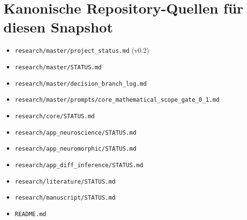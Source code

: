 \documentclass[11pt,a4paper]{article}
\begin{document}
\section*{Kanonische Repository-Quellen für diesen Snapshot}
\begin{itemize}
\item \texttt{research/master/project\_status.md} (v0.2)
\item \texttt{research/master/STATUS.md}
\item \texttt{research/master/decision\_branch\_log.md}
\item \texttt{research/master/prompts/core\_mathematical\_scope\_gate\_0\_1.md}
\item \texttt{research/core/STATUS.md}
\item \texttt{research/app\_neuroscience/STATUS.md}
\item \texttt{research/app\_neuromorphic/STATUS.md}
\item \texttt{research/app\_diff\_inference/STATUS.md}
\item \texttt{research/literature/STATUS.md}
\item \texttt{research/manuscript/STATUS.md}
\item \texttt{README.md}
\end{itemize}
\end{document}
